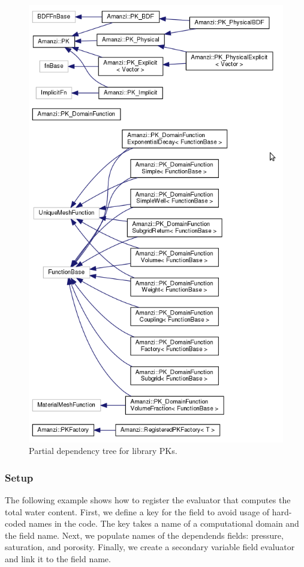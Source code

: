 \begin{figure}[h!]
\begin{center}
\includegraphics[height=0.9\textheight]{figs/pks.png}
\caption{Partial dependency tree for library PKs.\label{fig:pks}}
\end{center}
\end{figure}


\subsubsection{Setup}
The following example shows how to register the evaluator that computes 
the total water content.
First, we define a key for the field to avoid usage of hard-coded names
in the code. 
The key takes a name of a computational domain and the field name.
Next, we populate names of the dependends fields: pressure, saturation,
and porosity.
Finally, we create a secondary variable field evaluator and link it
to the field name.


